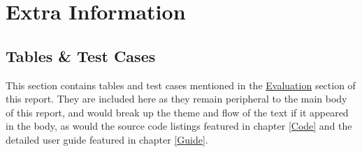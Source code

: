 \chapter{Extra Information} \label{Appendix}
\section{Tables \& Test Cases}

This section contains tables and test cases mentioned in the \hyperref[Evaluation]{Evaluation} section of this report. They are included here as they remain peripheral to the main body of this report, and would break up the theme and flow of the text if it appeared in the body, as would the source code listings featured in chapter \ref{Code} and the detailed user guide featured in chapter \ref{Guide}.

